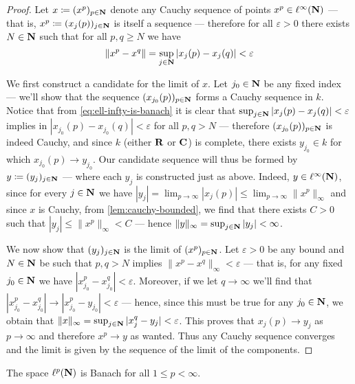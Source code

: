 \begin{proof}
Let \(x \coloneq (x^p)_{p \in \mathbf{N}}\) denote any Cauchy sequence of points \(x^p
\in \ell^{\infty}(\mathbf{N})\) --- that is, \(x^p \coloneq (x_j(p))_{j \in \mathbf{N}}\) is
itself a sequence --- therefore for all \(\varepsilon > 0\) there exists \(N \in
\mathbf{N}\) such that for all \(p, q \geq N\) we have
\begin{equation}\label{eq:ell-infty-is-banach}
\| x^p - x^q \| = \sup_{j \in \mathbf{N}} |x_j(p) - x_j(q)| < \varepsilon
\end{equation}

We first construct a candidate for the limit of \(x\). Let \(j_0 \in \mathbf{N}\) be any
fixed index --- we'll show that the sequence \((x_{j_0}(p))_{p \in \mathbf{N}}\) forms a
Cauchy sequence in \(k\). Notice that from \cref{eq:ell-infty-is-banach} it is
clear that \(\sup_{j \in \mathbf{N}} |x_j(p) - x_j(q)| < \varepsilon\) implies in
\(|x_{j_0}(p) - x_{j_0}(q)| < \varepsilon\) for all \(p, q > N\) --- therefore
\((x_{j_0}(p))_{p \in \mathbf{N}}\) is indeed Cauchy, and since \(k\) (either \(\mathbf{R}\) or
\(\mathbf{C}\)) is complete, there exists \(y_{j_0} \in k\) for which \(x_{j_0}(p) \to
y_{j_0}\). Our candidate sequence will thus be formed by \(y \coloneq (y_j)_{j
\in \mathbf{N}}\) --- where each \(y_j\) is constructed just as above. Indeed, \(y \in
\ell^{\infty}(\mathbf{N})\), since for every \(j \in \mathbf{N}\) we have \(|y_j| = \lim_{p \to
\infty} |x_j(p)| \leq \lim_{p \to \infty} \| x^p \|_{\infty}\) and since
\(x\) is Cauchy, from \cref{lem:cauchy-bounded}, we find that there exists \(C >
0\) such that \(|y_j| \leq \| x^{p} \|_{\infty} < C\) --- hence \(\| y
\|_{\infty} = \sup_{j \in \mathbf{N}} |y_j| < \infty\).

We now show that \((y_j)_{j \in \mathbf{N}}\) is the limit of \((x^p)_{p \in \mathbf{N}}\). Let
\(\varepsilon > 0\) be any bound and \(N \in \mathbf{N}\) be such that \(p, q > N\)
implies \(\| x^p - x^q \|_{\infty} < \varepsilon\) --- that is, for any fixed
\(j_0 \in \mathbf{N}\) we have \(|x_{j_0}^p - x_{j_0}^q| < \varepsilon\). Moreover, if
we let \(q \to \infty\) we'll find that \(|x_{j_0}^p - x_{j_0}^q| \to |x_{j_0}^p
- y_{j_0}| < \varepsilon\) --- hence, since this must be true for any \(j_0 \in
\mathbf{N}\), we obtain that \(\| x \|_{\infty} = \sup_{j \in \mathbf{N}} |x_j^q - y_j| <
\varepsilon\). This proves that \(x_j(p) \to y_j\) as \(p \to \infty\) and
therefore \(x^p \to y\) as wanted. Thus any Cauchy sequence converges and the
limit is given by the sequence of the limit of the components.
\end{proof}

\begin{proposition}
\label{prop:ell-p-is-banach}
The space \(\ell^p(\mathbf{N})\) is Banach for all \(1 \leq p < \infty\).
\end{proposition}

